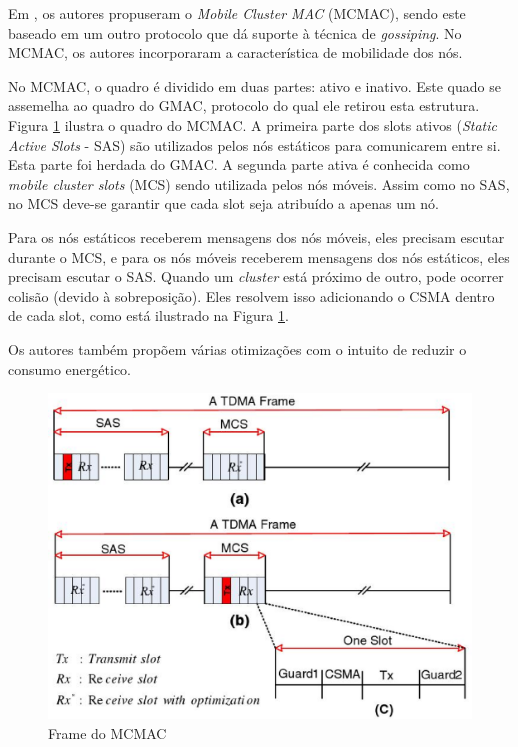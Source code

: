 \documentclass[12pt]{article}
\begin{document}
    Em \cite{20103113115754}, os autores propuseram o \textit{Mobile Cluster MAC} (MCMAC), sendo este baseado em um outro protocolo que dá suporte à técnica de \textit{gossiping}. No MCMAC, os autores incorporaram a característica de mobilidade dos nós.

    No MCMAC, o quadro é dividido em duas partes: ativo e inativo. Este quado se assemelha ao quadro do GMAC, protocolo do qual ele retirou esta estrutura. Figura \ref{fig:mcmac} ilustra o quadro do MCMAC. A primeira parte dos slots ativos (\textit{Static Active Slots} - SAS) são utilizados pelos nós estáticos para comunicarem entre si. Esta parte foi herdada do GMAC. A segunda parte ativa é conhecida como \textit{mobile cluster slots} (MCS) sendo utilizada pelos nós móveis. Assim como no SAS, no MCS deve-se garantir que cada slot seja atribuído a apenas um nó. 

    Para os nós estáticos receberem mensagens dos nós móveis, eles precisam escutar durante o MCS, e para os nós móveis receberem mensagens dos nós estáticos, eles precisam escutar o SAS. Quando um \textit{cluster} está próximo de outro, pode ocorrer colisão (devido à sobreposição). Eles resolvem isso adicionando o CSMA dentro de cada slot, como está ilustrado na Figura \ref{fig:mcmac}.

    Os autores também propõem várias otimizações com o intuito de reduzir o consumo energético.
    
\begin{figure}
\centering
\includegraphics[scale=0.35]{imagens/mcmac}
\caption{Frame do MCMAC \cite{20103113115754}}
\label{fig:mcmac}
\end{figure}
\end{document}
